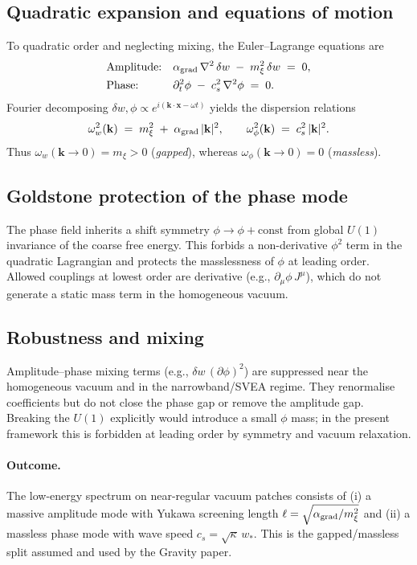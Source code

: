 \documentclass[11pt]{article}
\begin{document}
\subsection*{Quadratic expansion and equations of motion}
To quadratic order and neglecting mixing, the Euler–Lagrange equations are
\begin{align}
  &\text{Amplitude:} && \alpha_{\rm grad}\,\nabla^2\,\delta w \; -\; m_\xi^2\,\delta w \;=\; 0, \\
  &\text{Phase:} && \partial_t^2\phi \; -\; c_s^2\,\nabla^2\phi \;=\; 0.
\end{align}
Fourier decomposing $\delta w,\phi \propto e^{i(\mathbf k\cdot\mathbf x - \omega t)}$ yields the dispersion relations
\begin{equation}
  \omega_w^2(\mathbf k) \;=\; m_\xi^2 \; +\; \alpha_{\rm grad}\, |\mathbf k|^2, \qquad \omega_\phi^2(\mathbf k) \;=\; c_s^2\, |\mathbf k|^2.
\end{equation}
Thus $\omega_w(\mathbf k\to 0)=m_\xi>0$ (\emph{gapped}), whereas $\omega_\phi(\mathbf k\to 0)=0$ (\emph{massless}).

\subsection*{Goldstone protection of the phase mode}
The phase field inherits a shift symmetry $\phi\to\phi+\text{const}$ from global $U(1)$ invariance of the coarse free energy. This forbids a non-derivative $\phi^2$ term in the quadratic Lagrangian and protects the masslessness of $\phi$ at leading order. Allowed couplings at lowest order are derivative (e.g., $\partial_\mu\phi\,J^\mu$), which do not generate a static mass term in the homogeneous vacuum.

\subsection*{Robustness and mixing}
Amplitude–phase mixing terms (e.g., $\delta w\, (\partial\phi)^2$) are suppressed near the homogeneous vacuum and in the narrowband/SVEA regime. They renormalise coefficients but do not close the phase gap or remove the amplitude gap. Breaking the $U(1)$ explicitly would introduce a small $\phi$ mass; in the present framework this is forbidden at leading order by symmetry and vacuum relaxation.

\paragraph{Outcome.} The low-energy spectrum on near-regular vacuum patches consists of (i) a massive amplitude mode with Yukawa screening length $\ell=\sqrt{\alpha_{\rm grad}/m_\xi^2}$ and (ii) a massless phase mode with wave speed $c_s=\sqrt{\kappa}\,w_*$. This is the gapped/massless split assumed and used by the Gravity paper.
\end{document}
